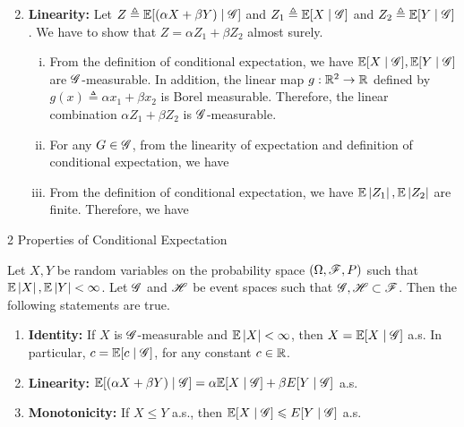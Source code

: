 \documentclass[12pt,aspectratio=169]{beamer}
\begin{document}
\begin{frame}
\begin{Proof}
\begin{enumerate}
\setcounter{enumi}{1}
\item \textbf{Linearity:} 
Let $Z \triangleq \mathbb{E}[(\alpha X + \beta Y) \mid \mathscr{G}]$ and $Z_1 \triangleq \mathbb{E}[X\mid\mathscr{G}]$ and $Z_2\triangleq\mathbb{E}[Y\mid\mathscr{G}]$. 
We have to show that $Z = \alpha Z_1+ \beta Z_2$ almost surely. 
\begin{enumerate}[(i)]
\item <2-> From the definition of conditional expectation, we have $\mathbb{E}[X\mid\mathscr{G}], \mathbb{E}[Y\mid\mathscr{G}]$ are $\mathscr{G}$-measurable. 
In addition, the linear map $g: \mathbb{R}^2\to\mathbb{R}$ defined by $g(x) \triangleq \alpha x_1 + \beta x_2$ is Borel measurable. 
Therefore, the linear combination $\alpha Z_1 + \beta Z_2$ is $\mathscr{G}$-measurable.
\item <3-> For any $G \in \mathscr{G}$, from the linearity of expectation and definition of conditional expectation, we have 
\item <4-> From the definition of conditional expectation, we have $\mathbb{E}\left\lvert Z_1\right\rvert, \mathbb{E}\left\lvert Z_2\right\rvert$ are finite. 
Therefore, we have 
\end{enumerate}
\end{enumerate}
\end{Proof}
\end{frame}


\begin{frame}{2 Properties of Conditional Expectation}
\begin{prop} 
Let $X,Y$ be random variables on the probability space $(\Omega, \mathscr{F}, P)$ such that $\mathbb{E}\left\lvert X\right\rvert , \mathbb{E}\left\lvert Y\right\rvert < \infty$. 
Let $\mathscr{G}$ and $\mathscr{H}$ be event spaces such that $\mathscr{G}, \mathscr{H} \subset \mathscr{F}$. 
Then the following statements are true. 
\begin{enumerate}
\item \textbf{Identity:} If $X$ is $\mathscr{G}$-measurable and $\mathbb{E}\left\lvert X\right\rvert < \infty$, then $X = \mathbb{E}[X\mid\mathscr{G}]$ a.s. 
In particular, $c = \mathbb{E}[c\mid \mathscr{G}]$, for any constant $c \in  \mathbb{R}$. 
\item \textbf{Linearity:} $\mathbb{E}[(\alpha X + \beta Y) \mid \mathscr{G}] = \alpha \mathbb{E}[X\mid\mathscr{G}] + \beta E[Y\mid \mathscr{G}]$ a.s.
\item \textbf{Monotonicity:} If $X \le Y$ a.s., then $\mathbb{E}[X\mid\mathscr{G}] \leqslant E[Y\mid \mathscr{G}]$ a.s.
\end{enumerate}
\end{prop}
\end{frame}
\end{document}
